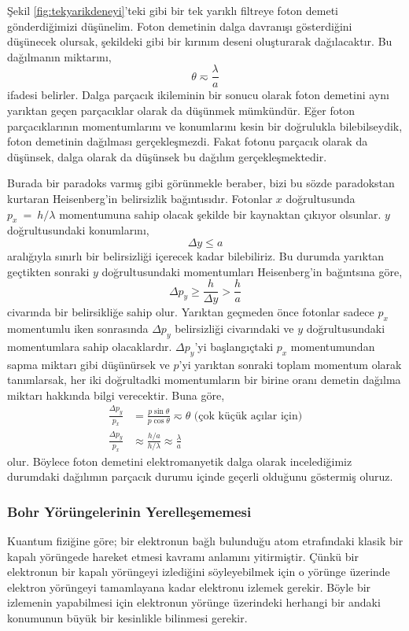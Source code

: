 \documentclass[a4paper,12pt, twoside]{article}
\begin{document}
Şekil \ref{fig:tekyarikdeneyi}'teki gibi bir tek yarıklı filtreye foton demeti gönderdiğimizi düşünelim. Foton demetinin dalga davranışı gösterdiğini düşünecek olursak, şekildeki gibi bir kırınım deseni oluşturarak dağılacaktır. Bu dağılmanın miktarını,
\begin{equation*}
\theta \eqsim \frac{\lambda}{a}
\end{equation*}
ifadesi belirler. Dalga parçacık ikileminin bir sonucu olarak foton demetini aynı yarıktan geçen parçacıklar olarak da düşünmek mümkündür. Eğer foton parçacıklarının momentumlarını ve konumlarını kesin bir doğrulukla bilebilseydik, foton demetinin dağılması gerçekleşmezdi. Fakat fotonu parçacık olarak da düşünsek, dalga olarak da düşünsek bu dağılım gerçekleşmektedir. 

Burada bir paradoks varmış gibi görünmekle beraber, bizi bu sözde paradokstan kurtaran Heisenberg'in belirsizlik bağıntısıdır. Fotonlar $x$ doğrultusunda $p_x~=~h/\lambda$ momentumuna sahip olacak şekilde bir kaynaktan çıkıyor olsunlar. $y$ doğrultusundaki konumlarını,
\begin{equation*}
\Delta y \leq a
\end{equation*}
aralığıyla sınırlı bir belirsizliği içerecek kadar bilebiliriz. Bu durumda yarıktan geçtikten sonraki $y$ doğrultusundaki momentumları Heisenberg'in bağıntsına göre,
\begin{equation*}
\Delta p_y \geq \frac{h}{\Delta y}>\frac{h}{a}
\end{equation*}
civarında bir belirsikliğe sahip olur. Yarıktan geçmeden önce fotonlar sadece $p_x$ momentumlu iken sonrasında $\Delta p_y$ belirsizliği civarındaki ve $y$ doğrultusundaki momentumlara sahip olacaklardır.
$\Delta p_y$'yi başlangıçtaki $p_x$ momentumundan sapma miktarı gibi düşünürsek ve $p$'yi yarıktan sonraki toplam momentum olarak tanımlarsak, her iki doğrultadki momentumların bir birine oranı demetin dağılma miktarı hakkında bilgi verecektir. Buna göre,
\begin{align}
\frac{\Delta p_y}{p_x} &= \frac{p \sin\theta}{p \cos\theta}\eqsim\theta \text{ (çok küçük açılar için)}\\
\frac{\Delta p_y}{p_x} &\approx \frac { h / a } { h / \lambda } \approx \frac { \lambda } { a }
\end{align}
olur. Böylece foton demetini elektromanyetik dalga olarak incelediğimiz durumdaki dağılımın parçacık durumu içinde geçerli olduğunu göstermiş oluruz.


\subsubsection{Bohr Yörüngelerinin Yerelleşememesi}
Kuantum fiziğine göre; bir elektronun bağlı bulunduğu atom etrafındaki klasik bir kapalı yörüngede hareket etmesi kavramı anlamını yitirmiştir. Çünkü bir elektronun bir kapalı yörüngeyi izlediğini söyleyebilmek için o yörünge üzerinde elektron yörüngeyi tamamlayana kadar elektronu izlemek gerekir. Böyle bir izlemenin yapabilmesi için elektronun yörünge üzerindeki herhangi bir andaki konumunun büyük bir kesinlikle bilinmesi gerekir.
\end{document}
